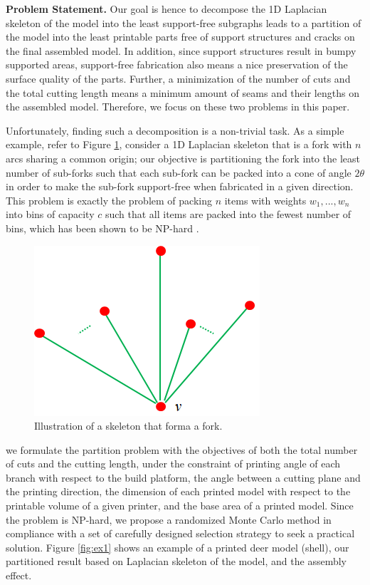 \textbf{Problem Statement.} Our goal is hence to decompose the 1D Laplacian skeleton of the model into the least support-free subgraphs leads to a partition of the model into the least printable parts free of support structures and cracks on the final assembled model. In addition, since support structures result in bumpy supported areas, support-free fabrication also means a nice preservation of the surface quality of the parts. Further, a minimization of the number of cuts and the total cutting length means a minimum amount of seams and their lengths on the assembled model. Therefore, we focus on these two problems in this paper.

Unfortunately, finding such a decomposition is a non-trivial task. As a simple example, refer to Figure \ref{fig:fork}, consider a 1{D} Laplacian skeleton that is a fork with $n$ arcs sharing a common origin; our objective is partitioning the fork into the least number of sub-forks such that each sub-fork can be packed into a cone of angle $2\theta$  in order to make the sub-fork support-free when fabricated in a given direction. This problem is exactly the problem of packing $n$ items with weights $w_1, ..., w_n$ into bins of capacity $c$ such that all items are packed into the fewest number of bins, which has been shown to be NP-hard \cite{Fukunaga:2007}.


\begin{figure}[tbp]
  \centering
  \includegraphics[width=0.5\linewidth]{figs/fork.png}
  \caption{\label{fig:fork}%
           Illustration of a skeleton that forma a fork.}
\end{figure}


we formulate the partition problem with the objectives of both the total number of cuts and the cutting length, under the constraint of printing angle of each branch with respect to the build platform, the angle between a cutting plane and the printing direction, the dimension of each printed model with respect to the printable volume of a given printer, and the base area of a printed model. Since the problem is NP-hard, we propose a randomized Monte Carlo method in compliance with a set of carefully designed selection strategy to seek a practical solution. Figure \ref{fig:ex1} shows an example of a printed deer model (shell), our partitioned result based on Laplacian skeleton of the model, and the assembly effect.



